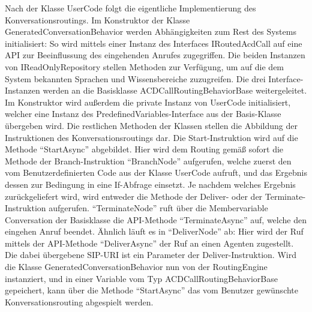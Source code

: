 Nach der Klasse UserCode folgt die eigentliche Implementierung des Konversationsroutings. Im Konstruktor der Klasse GeneratedConversationBehavior werden Abhängigkeiten zum Rest des Systems initialisiert: So wird mittels einer Instanz des Interfaces IRoutedAcdCall auf eine API zur Beeinflussung des eingehenden Anrufes zugegriffen. Die beiden Instanzen von IReadOnlyRepository stellen Methoden zur Verfügung, um auf die dem System bekannten Sprachen und Wissensbereiche zuzugreifen. Die drei Interface-Instanzen werden an die Basisklasse ACDCallRoutingBehaviorBase weitergeleitet. Im Konstruktor wird außerdem die private Instanz von UserCode initialisiert, welcher eine Instanz des PredefinedVariables-Interface aus der Basis-Klasse übergeben wird. Die restlichen Methoden der Klassen stellen die Abbildung der Instruktionen des Konversationsroutings dar. Die Start-Instruktion wird auf die Methode ``StartAsync'' abgebildet. Hier wird dem Routing gemäß sofort die Methode der Branch-Instruktion ``BranchNode'' aufgerufen, welche zuerst den vom Benutzerdefinierten Code aus der Klasse UserCode aufruft, und das Ergebnis dessen zur Bedingung in eine If-Abfrage einsetzt. Je nachdem welches Ergebnis zurückgeliefert wird, wird entweder die Methode der Deliver- oder der Terminate-Instruktion aufgerufen. ``TerminateNode'' ruft über die Membervariable Conversation der Basisklasse die API-Methode ``TerminateAsync'' auf, welche den eingehen Anruf beendet. Ähnlich läuft es in ``DeliverNode'' ab: Hier wird der Ruf mittels der API-Methode ``DeliverAsync'' der Ruf an einen Agenten zugestellt. Die dabei übergebene SIP-URI ist ein Parameter der Deliver-Instruktion.
\newline
Wird die Klasse GeneratedConversationBehavior nun von der RoutingEngine instanziert, und in einer Variable vom Typ ACDCallRoutingBehaviorBase gepeichert, kann über die Methode ``StartAsync'' das vom Benutzer gewünschte Konversationsrouting abgespielt werden.


